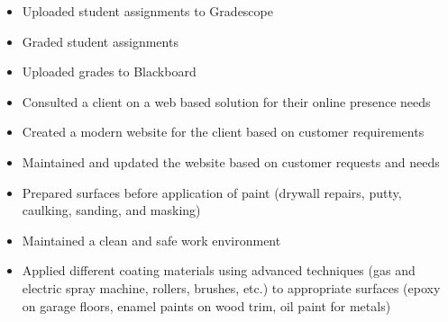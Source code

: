 \documentclass[10pt,a4paper,ragged2e,withhyper]{altacv}
\begin{document}

    \makecvheader



    \begin{paracol}{2}


      \begin{itemize}
          \item Uploaded student assignments to Gradescope
          \item Graded student assignments 
          \item Uploaded grades to Blackboard
      \end{itemize}

      \begin{itemize}
          \item Consulted a client on a web based solution for their online presence needs
          \item Created a modern website for the client based on customer requirements 
          \item Maintained and updated the website based on customer requests and needs
      \end{itemize}

      \begin{itemize}
        \item Prepared surfaces before application of paint (drywall repairs, putty, caulking, sanding, and masking)
        \item Maintained a clean and safe work environment
        \item Applied different coating materials using advanced techniques (gas and electric spray machine, rollers, brushes, etc.) to appropriate surfaces (epoxy on garage floors, enamel paints on wood trim, oil paint for metals)
      \end{itemize}


\end{paracol}
\end{document}
